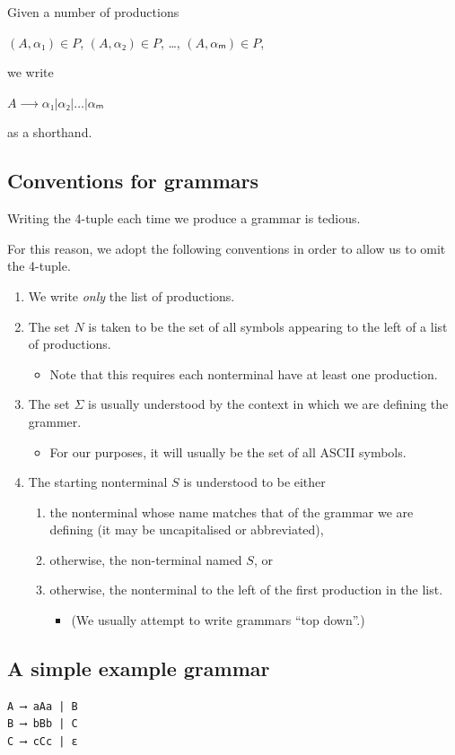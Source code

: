 \documentclass[11pt]{article}
\theoremstyle{definition}
\begin{document}
Given a number of
productions
\begin{center}
\((A, α₁) ∈ P\), \((A, α₂) ∈ P\), …, \((A, αₘ) ∈ P\),
\end{center}
we write
\begin{center}
\(A ⟶ α₁ | α₂ | … | αₘ\)
\end{center}
as a shorthand.

\subsection{Conventions for grammars}
\label{sec:org5527a2b}
Writing the 4-tuple each time we produce a grammar is tedious.

For this reason, we adopt the following conventions
in order to allow us to omit the 4-tuple.
\begin{enumerate}
\item We write \emph{only} the list of productions.
\item The set \(N\) is taken to be the set of all symbols
appearing to the left of a list of productions.
\begin{itemize}
\item Note that this requires each nonterminal have
at least one production.
\end{itemize}
\item The set \(Σ\) is usually understood by the context
in which we are defining the grammer.
\begin{itemize}
\item For our purposes, it will usually be the set of
all ASCII symbols.
\end{itemize}
\item The starting nonterminal \(S\) is understood to be either
\begin{enumerate}
\item the nonterminal whose name matches that of the grammar
we are defining (it may be uncapitalised or abbreviated),
\item otherwise, the non-terminal named \(S\), or
\item otherwise, the nonterminal to the left of
the first production in the list.
\begin{itemize}
\item (We usually attempt to write grammars “top down”.)
\end{itemize}
\end{enumerate}
\end{enumerate}

\subsection{A simple example grammar}
\label{sec:org40e6ba4}
\begin{verbatim}
A ⟶ aAa | B
B ⟶ bBb | C
C ⟶ cCc | ε
\end{verbatim}
\end{document}
